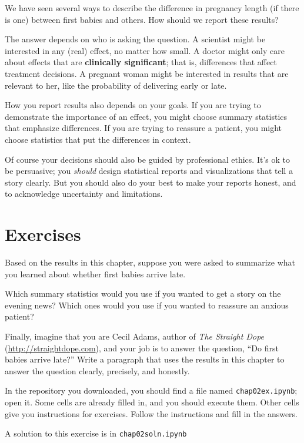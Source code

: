 \documentclass[12pt]{book}
\begin{document}
We have seen several ways to describe the difference in pregnancy
length (if there is one) between first babies and others.  How should
we report these results?

The answer depends on who is asking the question.  A scientist might
be interested in any (real) effect, no matter how small.  A doctor
might only care about effects that are {\bf clinically significant};
that is, differences that affect treatment decisions.  A pregnant
woman might be interested in results that are relevant to her, like
the probability of delivering early or late.
 

How you report results also depends on your goals.  If you are trying
to demonstrate the importance of an effect, you might choose summary
statistics that emphasize differences.  If you are trying to reassure
a patient, you might choose statistics that put the differences in
context.

Of course your decisions should also be guided by professional ethics.
It's ok to be persuasive; you {\em should\/} design statistical reports
and visualizations that tell a story clearly.  But you should also do
your best to make your reports honest, and to acknowledge uncertainty
and limitations.


\section{Exercises}

\begin{exercise}
Based on the results in this chapter, suppose you were asked to
summarize what you learned about whether first babies arrive late.

Which summary statistics would you use if you wanted to get a story
on the evening news?  Which ones would you use if you wanted to
reassure an anxious patient?

Finally, imagine that you are Cecil Adams, author of {\it The Straight
  Dope\/} (\url{http://straightdope.com}), and your job is to answer the
question, ``Do first babies arrive late?''  Write a paragraph that
uses the results in this chapter to answer the question clearly,
precisely, and honestly.

\end{exercise}

\begin{exercise}
In the repository you downloaded, you should find a file named
\verb"chap02ex.ipynb"; open it.  Some cells are already filled in, and
you should execute them.  Other cells give you instructions for
exercises.  Follow the instructions and fill in the answers.

A solution to this exercise is in \verb"chap02soln.ipynb"
\end{exercise}
\end{document}
